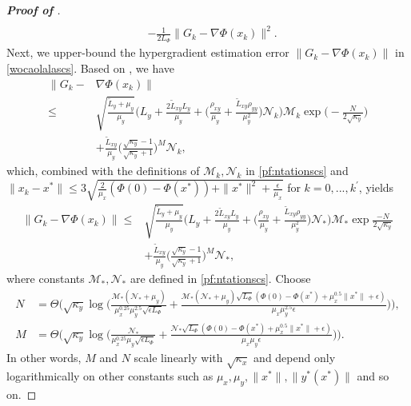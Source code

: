 \documentclass{osudissert96}
\begin{document}
\begin{proof}[{\bf Proof of }]
\begin{align}
 \\& - \frac{1}{2L_\Phi}\|G_k-\nabla\Phi(x_k)\|^2.
 \end{align}
Next, we upper-bound the hypergradient estimation error $\|G_k-\nabla\Phi(x_k)\|$ in \cref{wocaolalascs}.  Based on , we have 
\begin{align*}
 \|G_k-&\nabla \Phi( x_k)\|  \nonumber 
\\\leq &\sqrt{\frac{\widetilde L_y +\mu_y}{\mu_y}} \Big(L_y +\frac{2\widetilde L_{xy}L_y}{\mu_y} +\Big(\frac{\rho_{xy}}{\mu_y}+\frac{\widetilde L_{xy}\rho_{yy}}{\mu_y^2}\Big)\mathcal{N}_k\Big) \mathcal{M}_k \exp\Big(-\frac{N}{2\sqrt{\kappa_y}}\Big) \nonumber
\\&+\frac{\widetilde L_{xy}}{\mu_y}\Big(\frac{\sqrt{\kappa_y}-1}{\sqrt{\kappa_y}+1}\Big)^M\mathcal{N}_k, \nonumber
\end{align*}
which, combined with the definitions of $\mathcal{M}_k,\mathcal{N}_k$ in \cref{pf:ntationscs} and $\|x_{k}-x^*\|\leq 3\sqrt{\frac{2}{\mu_x}(\Phi(0) -\Phi(x^*))+ \|x^*\|^2+\frac{\epsilon}{\mu_x}}$ for $k=0,...,k^\prime$, yields 
\begin{align}
 \|G_k-\nabla \Phi( x_k)\| \leq &\sqrt{\frac{\widetilde L_y +\mu_y}{\mu_y}} \Big(L_y +\frac{2\widetilde L_{xy}L_y}{\mu_y} +\Big(\frac{\rho_{xy}}{\mu_y}+\frac{\widetilde L_{xy}\rho_{yy}}{\mu_y^2}\Big)\mathcal{N}_*\Big) \mathcal{M}_* \exp\frac{-N}{2\sqrt{\kappa_y}} \nonumber
\\&+\frac{\widetilde L_{xy}}{\mu_y}\Big(\frac{\sqrt{\kappa_y}-1}{\sqrt{\kappa_y}+1}\Big)^M\mathcal{N}_*,
\end{align}
where constants $\mathcal{M}_*,\mathcal{N}_*$ are defined in \cref{pf:ntationscs}. Choose 
{\small
\begin{align}\label{wangdehuas}
N&=\Theta\Big(\sqrt{\kappa_y}\log \Big(\frac{\mathcal{M}_*(\mathcal{N}_*+\mu_y)}{\mu_x^{0.25}\mu_y^{2.5}\sqrt{\epsilon L_\Phi}}+\frac{\mathcal{M}_*(\mathcal{N}_*+\mu_y)\sqrt{L_\Phi}(\Phi(0) -\Phi(x^*)+\mu_x^{0.5}\|x^*\|+\epsilon)}{\mu_x\mu_y^{2.5}\epsilon}\Big)\Big), \nonumber
\\M&=\Theta\Big(\sqrt{\kappa_y}\log \Big(\frac{\mathcal{N}_*}{\mu_x^{0.25}\mu_y\sqrt{\epsilon L_\Phi}}+\frac{\mathcal{N}_*\sqrt{L_\Phi}(\Phi(0) -\Phi(x^*)+\mu_x^{0.5}\|x^*\|+\epsilon)}{\mu_x\mu_y\epsilon}\Big)\Big).
\end{align} }
\hspace{-0.12cm}In other words, $M$ and $N$ scale linearly with $\sqrt{\kappa_x}$ and depend only logarithmically on other constants such as $\mu_x,\mu_y,\|x^*\|,\|y^*(x^*)\|$ and so on.


\end{proof}
\end{document}

